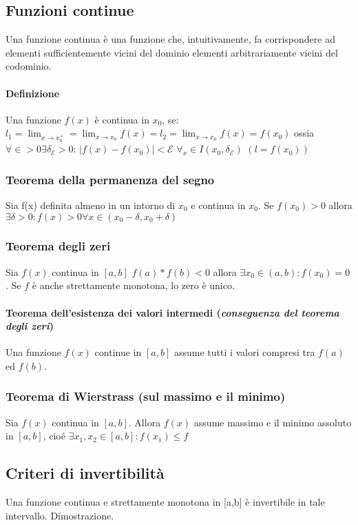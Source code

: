 \documentclass{book}
\begin{document}
\subsection{Funzioni continue}
Una funzione continua è una funzione che, intuitivamente, fa corrispondere ad elementi sufficientemente vicini del dominio elementi arbitrariamente vicini del codominio.
\paragraph{Definizione} Una funzione $f(x)$ è continua in $x_0$, se: $l_1=\lim_{x\to x^+_0}=\lim_{x\to x_0}f(x)=l_2=\lim_{x\to x_0}f(x)=f(x_0)$ ossia $\forall\in>0\exists \delta_\mathcal{E} > 0$: $|f(x)-f(x_0)|<\mathcal{E}$ $\forall_x\in I(x_0,\delta_\mathcal{E})$ $(l=f(x_0))$
\subsubsection{Teorema della permanenza del segno}
Sia f(x) definita almeno in un intorno di $x_0$ e continua in $x_0$. Se $f(x_0)>0$ allora $\exists \delta >0 : f(x) >0 \forall x\in (x_0-\delta ,x_0+\delta{})$
\subsubsection{Teorema degli zeri}
Sia $f(x)$ continua in $[a,b]$ $f(a)*f(b)<0$ allora $\exists x_0 \in (a,b): f(x_0)=0$. Se $f$ è anche strettamente monotona, lo zero è unico.
\paragraph{Teorema dell'esistenza dei valori intermedi (\textit{conseguenza del teorema degli zeri})}  
Una funzione $f(x)$ continue in $[a,b]$ assume tutti i valori compresi tra $f(a)$ ed $f(b)$.
\subsubsection{Teorema di Wierstrass (sul massimo e il minimo)}
Sia $f(x)$ continua in $[a,b]$. Allora $f(x)$ assume massimo e il minimo assoluto in $[a,b]$, cioé $\exists x_1, x_2 \in [a,b]: f(x_1)\leq f$
\subsection{Criteri di invertibilità}
Una funzione continua e strettamente monotona in [a,b] è invertibile in tale intervallo. Dimostrazione.
\printindex
\end{document}
